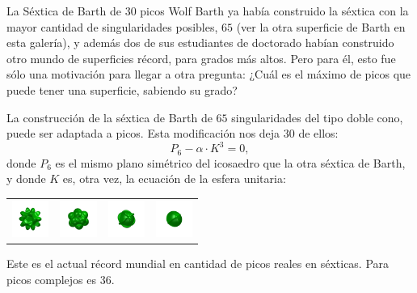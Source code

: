 \begin{surferPage}{La Séxtica de Barth de 30 picos}
    Wolf Barth ya había construido la séxtica con la mayor cantidad de
    singularidades posibles, $65$ (ver la otra superficie de Barth
    en esta galería), y además dos de sus estudiantes de doctorado habían
    construido otro mundo de superficies récord, para grados más altos.
    Pero para él, esto fue sólo una motivación para llegar a otra pregunta:
    ¿Cuál es el máximo de picos que puede tener una superficie, sabiendo su grado?

   La construcción de la séxtica de Barth de $65$ singularidades del tipo doble cono,
   puede ser adaptada a picos. Esta modificación nos deja $30$ de ellos: 
    \[P_6 - \alpha \cdot K^3=0,\]
  donde $P_6$ es el mismo plano simétrico del icosaedro que la otra séxtica de Barth,
  y donde $K$ es, otra vez, la ecuación de la esfera unitaria:
    \vspace*{-0.4em}
    \begin{center}
      \begin{tabular}{c@{\ }c@{\ }c@{\ }c}
        \includegraphics[height=1.2cm]{../../common/images/barthsextic_30A2}
        &
        \includegraphics[height=1.2cm]{../../common/images/barthsextic_30A2_3}
        &
        \includegraphics[height=1.2cm]{../../common/images/barthsextic_30A2_5}
        &
        \includegraphics[height=1.2cm]{../../common/images/barthsextic_30A2_6}
      \end{tabular}
    \end{center}    
    \vspace*{-0.3em}
     Este es el actual récord mundial en cantidad de picos reales en séxticas.
     Para picos complejos es $36$.
\end{surferPage}

